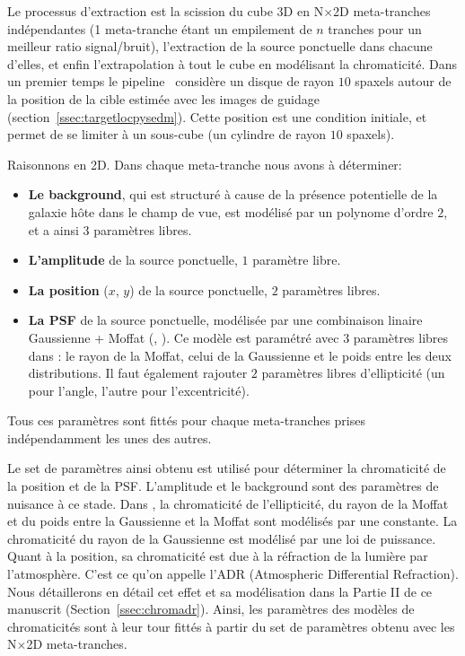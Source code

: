 \documentclass[../main/main.tex]{subfiles}
\begin{document}
Le processus d'extraction est la scission du cube 3D en N$\times$2D
meta-tranches indépendantes (1 meta-tranche étant un empilement de $n$
tranches pour un meilleur ratio signal/bruit), l'extraction de la source ponctuelle dans chacune
d'elles, et enfin l'extrapolation à tout le cube en modélisant la
chromaticité.
Dans un premier temps le pipeline \pysedm\ considère un disque de rayon $10$
spaxels autour de la position de la cible estimée avec les images de
guidage (section~\ref{ssec:targetlocpysedm}). Cette position est une
condition initiale, et permet de se limiter à un sous-cube (un cylindre
de rayon $10$ spaxels).

Raisonnons en 2D. Dans chaque meta-tranche nous avons à déterminer:
\begin{itemize}[label=$\bullet$]
\itemsep0em 
\item \textbf{Le background}, qui est structuré à cause de la
  présence potentielle de la galaxie hôte dans le champ de vue, est
  modélisé par un polynome d'ordre $2$, et a ainsi $3$ paramètres libres. 
\item \textbf{L'amplitude} de la source ponctuelle, $1$ paramètre libre.
\item \textbf{La position} ($x$, $y$) de la source ponctuelle, $2$ paramètres libres.
\item \textbf{La PSF} de la source ponctuelle, modélisée par une
  combinaison linaire Gaussienne + Moffat (\citet{Butonthese},
  \citet{Buton2013}). Ce modèle est paramétré avec $3$ paramètres libres
  dans \citet{pysedm}: le rayon de la Moffat, celui de la Gaussienne et
  le poids entre les deux distributions. Il faut également rajouter $2$ paramètres libres
  d'ellipticité (un pour l'angle, l'autre pour l'excentricité).
\end{itemize}

Tous ces paramètres sont fittés pour chaque meta-tranches prises
indépendamment les unes des autres.

Le set de paramètres ainsi obtenu est utilisé pour déterminer la
chromaticité de la position et de la PSF. L'amplitude et
le background sont des paramètres de nuisance à ce stade.
Dans \pysedm, la chromaticité de l'ellipticité, du rayon de la Moffat et du poids entre la
Gaussienne et la Moffat sont modélisés par une constante. La
chromaticité du rayon de la
Gaussienne est modélisé par une loi de puissance.
Quant à la position, sa chromaticité est due à la réfraction de la
lumière par l'atmosphère. C'est ce qu'on appelle l'ADR (Atmospheric
Differential Refraction). Nous détaillerons en détail cet effet et sa
modélisation dans la
Partie II de ce manuscrit (Section~\ref{ssec:chromadr}).
Ainsi, les paramètres des modèles de chromaticités sont à leur tour
fittés à partir du set de paramètres obtenu avec les N$\times$2D
meta-tranches.
\end{document}
